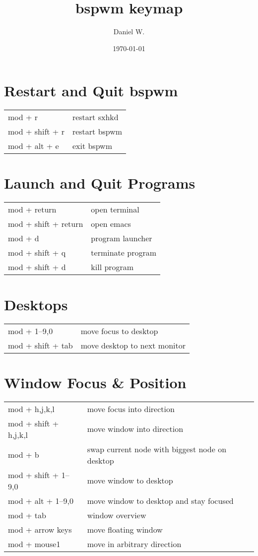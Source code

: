 \documentclass[
    10pt,
    a4paper,
    notitlepage,
]{scrartcl}
\title{bspwm keymap}
\author{Daniel W.}
\date{\today}
\begin{document}
\maketitle

\section{Restart and Quit bspwm}
\begin{tabular}{p{4cm}l}
    mod + r             & restart sxhkd                         \\
    mod + shift + r     & restart bspwm                         \\
    mod + alt + e       & exit bspwm
\end{tabular}

\section{Launch and Quit Programs}
\begin{tabular}{p{4cm}l}
    mod + return            & open terminal                         \\
    mod + shift + return    & open emacs                            \\
    mod + d                 & program launcher                      \\
    mod + shift + q         & terminate program                     \\
    mod + shift + d         & kill program
\end{tabular}

\section{Desktops}
\begin{tabular}{p{4cm}l}
    mod + 1--9,0          & move focus to desktop         \\
    mod + shift + tab     & move desktop to next monitor
\end{tabular}

\section{Window Focus \& Position}
\begin{tabular}{p{4cm}l}
    mod + h,j,k,l          & move focus into direction        \\
    mod + shift + h,j,k,l  & move window into direction        \\
    mod + b                & swap current node with biggest node on desktop \\
    mod + shift + 1--9,0   & move window to desktop         \\
    mod + alt + 1--9,0     & move window to desktop and stay focused       \\
    mod + tab              & window overview     \\
    mod + arrow keys       & move floating window              \\
    mod + mouse1           & move in arbitrary direction
\end{tabular}
\end{document}
